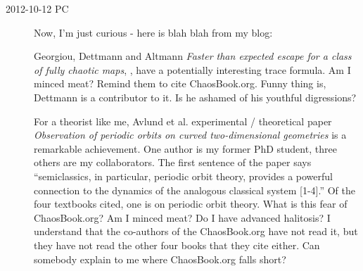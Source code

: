 \begin{description}

\item[2012-10-12 PC]                     \toCB
Now, I'm just curious - here is blah blah from my blog:

Georgiou, Dettmann and Altmann
\emph{Faster than expected escape for a class of fully chaotic maps},
, have a potentially interesting trace formula. Am I
minced meat? Remind them to cite ChaosBook.org. Funny thing is, Dettmann
is a contributor to it. Is he ashamed of his youthful digressions?

For a theorist like me, Avlund et al. experimental / theoretical
paper
\emph{Observation of periodic orbits on curved two-dimensional geometries}
is a remarkable achievement. One author is my former PhD student, three
others are my collaborators. The first sentence of the paper says
``semiclassics, in particular, periodic orbit theory, provides a powerful
connection to the dynamics of the analogous classical system [1-4].'' Of
the four textbooks cited, one is on periodic orbit theory. What is this
fear of ChaosBook.org? Am I minced meat? Do I have advanced halitosis? I
understand that the co-authors of the ChaosBook.org have not read it, but
they have not read the other four books that they cite either. Can
somebody explain to me where ChaosBook.org falls short?


\end{description}
